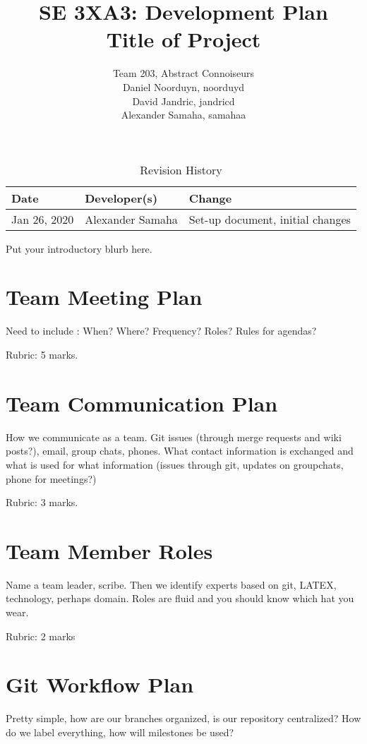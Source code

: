 \documentclass{article}
\title{SE 3XA3: Development Plan\\Title of Project}
\author{Team 203, Abstract Connoiseurs\\
Daniel Noorduyn, noorduyd\\
David Jandric, jandricd\\
Alexander Samaha, samahaa\\
}
\date{}
\begin{document}
\begin{table}[hp]
\caption{Revision History} \label{TblRevisionHistory}
\begin{tabularx}{\textwidth}{llX}
\toprule
\textbf{Date} & \textbf{Developer(s)} & \textbf{Change}\\
\midrule
Jan 26, 2020 & Alexander Samaha & Set-up document, initial changes\\
\bottomrule
\end{tabularx}
\end{table}

\newpage

\maketitle

Put your introductory blurb here.

\section{Team Meeting Plan}
Need to include :  When?  Where?  Frequency?  Roles?  Rules for agendas?

Rubric:  5 marks.

\section{Team Communication Plan}

How we communicate as a team.  Git issues (through merge requests and wiki
posts?), email, group chats, phones.  What contact information is exchanged and
what is used for what information (issues through git,  updates on groupchats,
phone for meetings?)

Rubric:  3 marks.

\section{Team Member Roles}
Name  a  team  leader,  scribe.   Then  we  identify  experts  based  on  git,  
LATEX,
technology,  perhaps  domain.   Roles  are  fluid  and  you  should  know  
which  hat
you wear.

Rubric:  2 marks

\section{Git Workflow Plan}

Pretty  simple,  how  are  our  branches  organized,  is  our  repository  
centralized?
How do we label everything, how will milestones be used?
\end{document}
